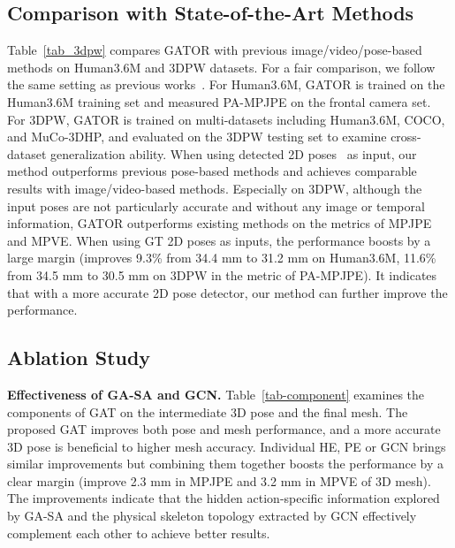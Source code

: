 \documentclass{article}
\def\VspacePa{\vspace{-0.30cm}}
\def\VspacePb{\vspace{-0.20cm}}
\begin{document}
\subsection{Comparison with State-of-the-Art Methods}
\VspacePb
Table~\ref{tab_3dpw} compares GATOR with previous image/video/pose-based methods on Human3.6M and 3DPW datasets. For a fair comparison, we follow the same setting as previous works~\cite{zheng2021lightweight, choi2020pose2mesh, kanazawa2018end, kolotouros2019learning}. 
For Human3.6M, GATOR is trained on the Human3.6M training set and measured PA-MPJPE on the frontal camera set. 
For 3DPW, GATOR is trained on multi-datasets including Human3.6M, COCO, and MuCo-3DHP, and evaluated on the 3DPW testing set to examine cross-dataset generalization ability. 
When using detected 2D poses~\cite{sun2018integral, zhang2020distribution} as input, our method outperforms previous pose-based methods and achieves comparable results with image/video-based methods. 
Especially on 3DPW, although the input poses are not particularly accurate and without any image or temporal information, GATOR outperforms existing methods on the metrics of MPJPE and MPVE. 
When using GT 2D poses as inputs, the performance boosts by a large margin (improves 9.3\% from 34.4 mm to 31.2 mm on Human3.6M, 11.6\% from 34.5 mm to 30.5 mm on 3DPW in the metric of PA-MPJPE). It indicates that with a more accurate 2D pose detector, our method can further improve the performance.

\VspacePa
\subsection{Ablation Study}
\VspacePb

\noindent \textbf{Effectiveness of GA-SA and GCN.}
Table~\ref{tab-component} examines the components of GAT on the intermediate 3D pose and the final mesh.
The proposed GAT improves both pose and mesh performance, and a more accurate 3D pose is beneficial to higher mesh accuracy. 
Individual HE, PE or GCN brings similar improvements but combining them together boosts the performance by a clear margin (improve 2.3 mm in MPJPE and 3.2 mm in MPVE of 3D mesh). The improvements indicate that the hidden action-specific information explored by GA-SA and the physical skeleton topology extracted by GCN effectively complement each other to achieve better results.
\end{document}
